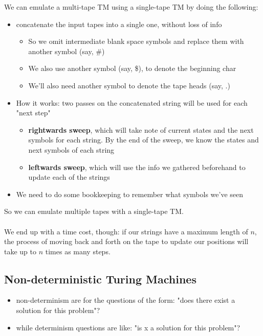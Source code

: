 \documentclass[12pt]{article}
\begin{document}
We can emulate a multi-tape TM using a single-tape TM by doing the following:
\begin{itemize}
    \item concatenate the input tapes into a single one, without loss of info
    \begin{itemize}
        \item So we omit intermediate blank space symbols and replace them with another symbol (say, \#)
        \item We also use another symbol (say, \$), to denote the beginning char
        \item We'll also need another symbol to denote the tape heads (say, $.$)
    \end{itemize}
    \item How it works: two passes on the concatenated string will be used for each "next step"
    \begin{itemize}
        \item \textbf{rightwards sweep}, which will take note of current states and the next symbols for each string. By the end of the sweep, we know the states and next symbols of each string
        \item \textbf{leftwards sweep}, which will use the info we gathered beforehand to update each of the strings
    \end{itemize}
    \item We need to do some bookkeeping to remember what symbols we've seen
\end{itemize}

So we can emulate multiple tapes with a single-tape TM.
\\
\\
We end up with a time cost, though: if our strings have a maximum length of $n$, the process of moving back and forth on the tape to update our positions will take up to $n$ times as many steps.

\subsection{Non-deterministic Turing Machines}

\begin{itemize}
    \item non-determinism are for the questions of the form: "does there exist a solution for this problem"?
    \item while determinism questions are like: "is x a solution for this problem"?
\end{itemize}
\end{document}
